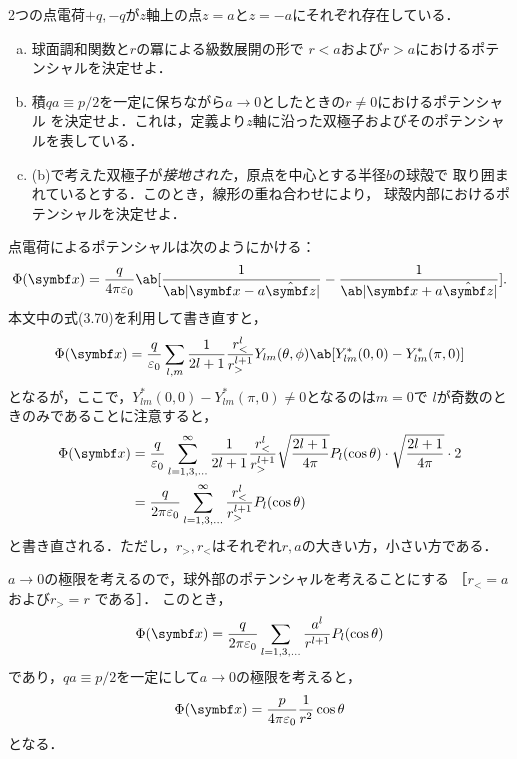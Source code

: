 \begin{bx1}
  2つの点電荷$+q,-q$が$z$軸上の点$z = a$と$z = -a$にそれぞれ存在している．
  \begin{enumerate}[(a)]%
    \item 
      球面調和関数と$r$の冪による級数展開の形で
      $r<a$および$r>a$におけるポテンシャルを決定せよ．
    \item 
      積$qa \equiv p / 2$を一定に保ちながら$a \to 0$としたときの$r \neq 0$におけるポテンシャル
      を決定せよ．これは，定義より$z$軸に沿った双極子およびそのポテンシャルを表している．
    \item (b)で考えた双極子が\emph{接地された}，原点を中心とする半径$b$の球殻で
      取り囲まれているとする．このとき，線形の重ね合わせにより，
      球殻内部におけるポテンシャルを決定せよ．
  \end{enumerate}%
\end{bx1}

  点電荷によるポテンシャルは次のようにかける：
  \begin{gather}%
    \Phi(\bs{x}) = \frac{q}{4\pi \eps_0}
    \ab[\frac{1}{\ab|\bs{x} - a\hat{\bs{z}}|}
    - \frac{1}{\ab|\bs{x} + a \hat{\bs{z}}|}].
  \end{gather}%
  本文中の式(3.70)を利用して書き直すと，
  \begin{gather}%
    \Phi(\bs{x}) = \frac{q}{\eps_0} \sum_{l,m} \frac{1}{2l+1} \frac{r_<^l}{r_>^{l+1}}
    Y_{lm}(\theta,\phi) \ab[Y^*_{lm}(0,0) - Y^*_{lm}(\pi,0)]
  \end{gather}%
  となるが，ここで，$Y^*_{lm}(0,0)-Y^*_{lm}(\pi,0) \neq 0$となるのは$m = 0$で
  $l$が奇数のときのみであることに注意すると，
  \begin{align}%
    \Phi(\bs{x}) &= \frac{q}{\eps_0} \sum_{l=1,3,\ldots}^{\infty} \frac{1}{2l+1} \frac{r_<^l}{r_>^{l+1}} \sqrt{\frac{2l+1}{4\pi}}P_l(\cos\theta) 
    \cdot \sqrt{\frac{2l+1}{4\pi}}\cdot 2\notag\\
    &= \frac{q}{2\pi\eps_0} \sum_{l=1,3,\ldots}^\infty \frac{r_<^l}{r_>^{l+1}} P_l(\cos\theta)
  \end{align}%
  と書き直される．ただし，$r_>, r_<$はそれぞれ$r, a$の大きい方，小さい方である．

  $a\to0$の極限を考えるので，球外部のポテンシャルを考えることにする
  ［$r_< = a$および$r_> = r$
  である］．
  このとき，
  \begin{gather}%
    \Phi(\bs{x}) = \frac{q}{2\pi\eps_0}\sum_{l=1,3,\ldots}\frac{a^l}{r^{l+1}} P_l(\cos\theta)
  \end{gather}%
  であり，$qa \equiv p/2$を一定にして$a \to 0$の極限を考えると，
  \begin{gather}%
    \Phi(\bs{x}) = \frac{p}{4\pi\eps_0} \frac{1}{r^2}\cos\theta
  \end{gather}%
  となる．

